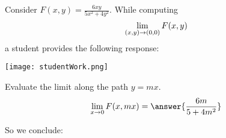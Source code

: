 \documentclass{ximera}
\author{Jim Talamo \and Bart Snapp}
\begin{document}
\begin{exercise}
  Consider $F(x,y) = \frac{6xy}{5x^2+4y^2}$. While computing
  \[
  \lim_{\left(x,y\right)\to \left(0,0\right)} F(x,y)
  \]
  a student provides the following response:
  \begin{image}
    \texttt{[image: studentWork.png]}
  \end{image}
  \begin{multipleChoice}
  \end{multipleChoice}
  \begin{exercise}
    Evaluate the limit along the path $y=mx$.
    \[
    \lim_{x\to 0 }F(x,mx) = \answer{\frac{6 m}{5+4m^2}}
    \]
    \begin{exercise}
      So we conclude:
      \begin{multipleChoice}
      \end{multipleChoice}
    \end{exercise}
  \end{exercise}
\end{exercise}
\end{document}
